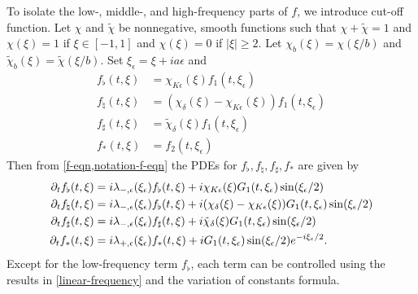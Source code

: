 To isolate the low-, middle-, and high-frequency parts of \(f\), we introduce cut-off function. Let \(\chi\) and \(\tilde\chi\) be nonnegative, smooth functions such that \(\chi + \tilde \chi = 1\) and \(\chi(\xi) = 1\) if \(\xi\in[-1,1]\) and \(\chi(\xi) = 0\) if \(|\xi|\geq 2.\) Let \(\chi_b(\xi) = \chi(\xi/b)\) and \(\tilde \chi_b (\xi) = \tilde \chi(\xi/b)\). Set \(\xi_\epsilon = \xi + i a \epsilon\) and
\begin{align*}
	f_{\flat}(t, \xi) &= \chi_{K\epsilon}(\xi) f_1(t,\xi_\epsilon) \\
	f_{\natural} (t,\xi) &= (\chi_\delta(\xi) - \chi_{K\epsilon}(\xi)) f_1(t, \xi_\epsilon) \\
	f_{\sharp} (t,\xi) &= \tilde \chi_\delta (\xi) f_1(t,\xi_\epsilon) \\
	f_* (t,\xi) &= f_2 (t,\xi_\epsilon)
\end{align*}
Then from \cref{f-eqn,notation-f-eqn} the PDEs for \(f_\flat, f_\natural, f_\sharp, f_*\) are given by
\begin{align}
	\partial_t f_\flat (t, \xi) &= i\lambda_{-,\epsilon}(\xi_\epsilon) f_\flat(t,\xi) + i \chi_{K\epsilon}(\xi) G_1(t,\xi_\epsilon) \sin(\xi_\epsilon/2) \label{f-flat-pde} \\
	\partial_t f_\natural (t,\xi) &= i\lambda_{-, \epsilon}(\xi_\epsilon) f_\flat(t,\xi) + i (\chi_\delta(\xi) - \chi_{K\epsilon}(\xi)) G_1(t,\xi_\epsilon) \sin(\xi_\epsilon/ 2) \notag \\
	\partial_t f_\sharp(t,\xi) &= i\lambda_{-, \epsilon}(\xi_\epsilon) f_\sharp (t,\xi) + i \tilde\chi_{\delta}(\xi) G_1(t,\xi_\epsilon) \sin(\xi_\epsilon/2) \notag \\
	\partial_t f_*(t, \xi) &= i \lambda_{+,\epsilon}(\xi_\epsilon) f_*(t,\xi) + i G_1(t, \xi_\epsilon) \sin(\xi_\epsilon / 2) e^{-i \xi_\epsilon /2}. \notag
\end{align}
Except for the low-frequency term \(f_\flat\), each term can be controlled using the results in \cref{linear-frequency} and the variation of constants formula.

